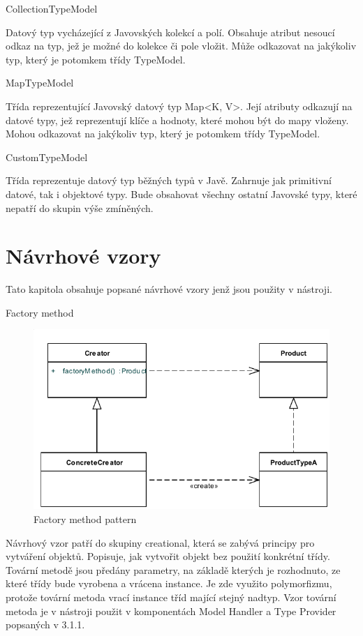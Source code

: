 \documentclass[11pt,twoside,a4paper]{book}
\begin{document}
CollectionTypeModel

Datový typ vycházející z Javovských kolekcí a polí. Obsahuje atribut nesoucí odkaz na typ,
jež je možné do kolekce či pole vložit. Může odkazovat na jakýkoliv typ, který je potomkem
třídy TypeModel.

MapTypeModel

Třída reprezentující Javovský datový typ Map<K, V>. Její atributy odkazují na datové typy,
jež reprezentují klíče a hodnoty, které mohou být do mapy vloženy. Mohou odkazovat na
jakýkoliv typ, který je potomkem třídy TypeModel.

CustomTypeModel

Třída reprezentuje datový typ běžných typů v Javě. Zahrnuje jak primitivní datové, tak i
objektové typy. Bude obsahovat všechny ostatní Javovské typy, které nepatří do skupin výše
zmíněných.

\section{Návrhové vzory}

Tato kapitola obsahuje popsané návrhové vzory jenž jsou použity v nástroji.

Factory method

\begin{figure}[h]
\begin{center}
\includegraphics[width=13cm]{images-pdf/Factory-Method-Design-Patternnew.pdf}
\caption{Factory method pattern}
\label{fig:logo}
\end{center}
\end{figure}

Návrhový vzor patří do skupiny creational, která se zabývá principy pro 
vytváření objektů. Popisuje, jak vytvořit objekt bez použití konkrétní třídy. 
Tovární metodě jsou předány parametry, na základě kterých je rozhodnuto, ze 
které třídy bude vyrobena a vrácena instance. Je zde využito polymorfizmu, 
protože tovární metoda vrací instance tříd mající stejný nadtyp. Vzor tovární 
metoda je v nástroji použit v komponentách Model Handler a Type Provider 
popsaných v 3.1.1.
\end{document}
